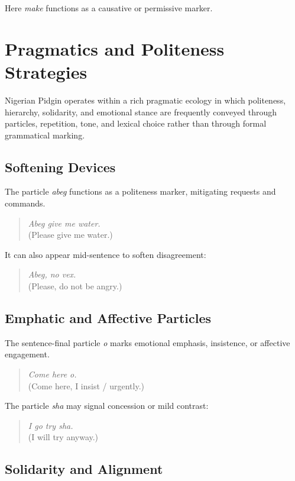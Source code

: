 \documentclass[12pt]{article}
\begin{document}
Here \textit{make} functions as a causative or permissive marker.

\section{Pragmatics and Politeness Strategies}

Nigerian Pidgin operates within a rich pragmatic ecology in which politeness, hierarchy, solidarity, and emotional stance are frequently conveyed through particles, repetition, tone, and lexical choice rather than through formal grammatical marking.

\subsection{Softening Devices}

The particle \textit{abeg} functions as a politeness marker, mitigating requests and commands.

\begin{quote}
\textit{Abeg give me water.} \\
(Please give me water.)
\end{quote}

It can also appear mid-sentence to soften disagreement:

\begin{quote}
\textit{Abeg, no vex.} \\
(Please, do not be angry.)
\end{quote}

\subsection{Emphatic and Affective Particles}

The sentence-final particle \textit{o} marks emotional emphasis, insistence, or affective engagement.

\begin{quote}
\textit{Come here o.} \\
(Come here, I insist / urgently.)
\end{quote}

The particle \textit{sha} may signal concession or mild contrast:

\begin{quote}
\textit{I go try sha.} \\
(I will try anyway.)
\end{quote}

\subsection{Solidarity and Alignment}
\end{document}
